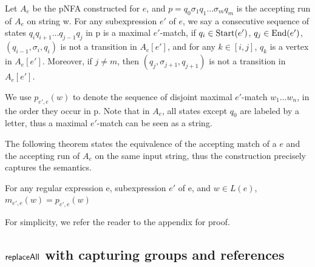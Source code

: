 \begin{definition}
  Let $A_e$ be the pNFA constructed for $e$, and $p = q_0 \sigma_1 q_1 \ldots
  \sigma_m q_m$ is the accepting run of $A_e$ on string w. For any subexpression $e'$ of $e$, we say a
  consecutive sequence of states $q_i q_{i + 1} \ldots q_{j - 1} q_j$ in p is
  a maximal $e'$-match, if $q_i \in \operatorname{Start} (e')$, $q_j \in \operatorname{End}
  (e')$, $(q_{i - 1}, \sigma_i, q_i)$ is not a transition in $A_e [e']$, and
  for any $k \in [i, j]$, $q_k$ is a vertex in $A_e [e']$. Moreover, if $j
  \neq m$, then $(q_j, \sigma_{j + 1}, q_{j + 1})$ is not a transition in $A_e
  [e']$.
  
  We use $p_{e', e} (w)$ to denote the sequence of disjoint maximal $e'$-match
  $w_1 \ldots w_n$, in the order they occur in p. Note that in $A_e$, all
  states except $q_0$ are labeled by a letter, thus a maximal $e'$-match can
  be seen as a string.
\end{definition}

The following  theorem states the equivalence of the accepting match of a \regexp[\sf CG] $e$ and the accepting run of $A_e$ on the same input string, thus the construction precisely captures the semantics. %
\begin{theorem}
 \label{theorem:regex_pnfa_equiv}
  For any regular expression e, subexpression $e'$ of e, and $w \in L (e)$,
  $m_{e', e} (w) = p_{e', e} (w)$
\end{theorem}

For simplicity, we refer the reader to the appendix for proof.


 
\subsection{$\mathsf{replaceAll}$ with capturing groups and references}



